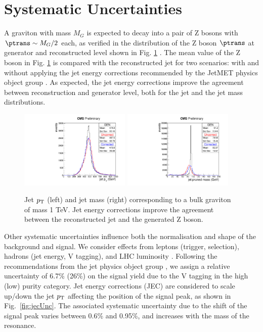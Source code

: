 \clearpage
\section{Systematic Uncertainties}
\label{sec:systematics}

A graviton with mass $M_G$ is expected to decay into a pair of Z bosons with $\ptrans\sim M_G/2$ each, as verified in the distribution of the Z boson $\ptrans$ at generator and reconstructed level shown in Fig. \ref{signal1TeV} . The mean value of the Z boson \ptrans in Fig. \ref{signal1TeV} is compared with the reconstructed jet \ptrans for two scenarios: with and without applying the jet energy corrections recommended by the JetMET physics object group \cite{jetmetPOG}. As expected, the jet energy corrections improve the agreement between reconstruction and generator level, both for the jet \ptrans and the jet mass distributions.  

\begin{figure}[htb]
\centering
\includegraphics[width=0.47\textwidth]{figures/objects/corrJetPt.pdf}
\includegraphics[width=0.47\textwidth]{figures/objects/corrPrunedMass.pdf}
\caption[Signal characterization]{Jet $p_{\rm T}$ (left) and jet mass (right) corresponding to a bulk graviton of mass 1 TeV. Jet energy corrections improve the agreement between the reconstructed jet and the generated Z boson.}
\label{signal1TeV}
\end{figure}

Other systematic uncertainties influence both the normalisation and shape of the background and signal. We consider effects from leptons (trigger, selection), hadrons (jet energy, V tagging), and LHC luminosity \cite{CMS-PAS-LUM-15-001}. Following the recommendations from the jet physics object group \cite{jetmetPOG}, we assign a relative uncertainty of 6.7\% (26\%) on the signal yield due to the V tagging in the high (low) purity category. Jet energy corrections (JEC) are considered to scale up/down the jet $p_{\rm T}$ affecting the position of the signal peak, as shown in Fig.~\ref{fig:jecUnc}. The associated systematic uncertainty due to the shift of the signal peak varies between 0.6\% and 0.95\%, and increases with the mass of the resonance. 

